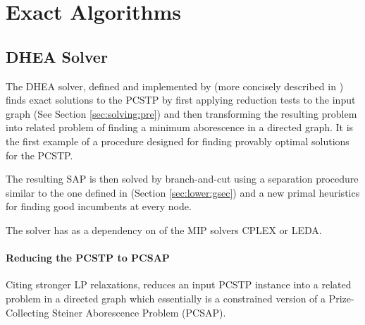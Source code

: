 \clearpage
\section{Exact Algorithms}\label{sec:solving:exact}

\subsection{DHEA Solver}
\label{sec:exact:dhea}
The DHEA solver, defined and implemented
by \citet{ljubic2005solving}
(more concisely described in \citet{ljubic2006algorithmic}) finds exact solutions to the PCSTP
by first applying
reduction tests to the input graph (See Section \ref{sec:solving:pre}) and
then transforming the resulting problem into related problem of finding a minimum
aborescence in a directed graph. It is the first example of a procedure designed for
finding provably optimal solutions for the PCSTP.

The resulting SAP is then solved by branch-and-cut using a separation procedure
similar to the one defined in \citet{lucena2004strong}
(Section \ref{sec:lower:gsec}) and a new primal heuristics for
finding good incumbents at every node.

The solver has as a dependency on of the MIP solvers CPLEX or LEDA.
 \paragraph{Reducing the PCSTP to PCSAP}
 Citing stronger LP relaxations, \citet{ljubic2005solving} reduces an input PCSTP instance
 into a related problem in a directed graph which essentially is a constrained version
 of a Prize-Collecting Steiner Aborescence Problem (PCSAP).

